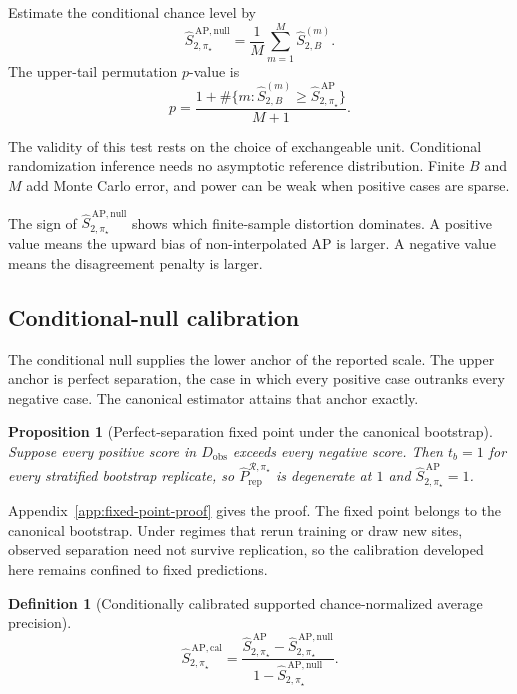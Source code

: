 \documentclass[11pt]{article}
\newcommand{\Regime}{\mathcal{R}}
\newcommand{\SAPHat}{\widehat S_{2,\pi_\star}^{\,\mathrm{AP}}}
\newcommand{\SAPnullHat}{\widehat S_{2,\pi_\star}^{\,\mathrm{AP,null}}}
\newcommand{\SAPcalHat}{\widehat S_{2,\pi_\star}^{\,\mathrm{AP,cal}}}
\newcommand{\PRepHat}{\widehat{P}_{\mathrm{rep}}^{\Regime,\pi_\star}}
\newtheorem{definition}{Definition}
\newtheorem{proposition}{Proposition}
\theoremstyle{remark}
\begin{document}
Estimate the conditional chance level by
\begin{equation}
\SAPnullHat
=
\frac{1}{M}\sum_{m=1}^{M}\widehat S_{2,B}^{(m)}.
\label{eq:conditional-null}
\end{equation}
The upper-tail permutation $p$-value is
\[
p
=
\frac{1+\#\{m:\widehat S_{2,B}^{(m)}\geq\SAPHat\}}{M+1}.
\]

The validity of this test rests on the choice of exchangeable unit. Conditional randomization inference needs no asymptotic reference distribution. Finite $B$ and $M$ add Monte Carlo error, and power can be weak when positive cases are sparse.

The sign of $\SAPnullHat$ shows which finite-sample distortion dominates. A positive value means the upward bias of non-interpolated AP is larger. A negative value means the disagreement penalty is larger.

\subsection{Conditional-null calibration}

The conditional null supplies the lower anchor of the reported scale. The upper anchor is perfect separation, the case in which every positive case outranks every negative case. The canonical estimator attains that anchor exactly.

\begin{proposition}[Perfect-separation fixed point under the canonical bootstrap]
\label{prop:fixed-point}
Suppose every positive score in $D_{\mathrm{obs}}$ exceeds every negative score. Then $t_b=1$ for every stratified bootstrap replicate, so $\PRepHat$ is degenerate at $1$ and $\SAPHat=1$.
\end{proposition}

Appendix~\ref{app:fixed-point-proof} gives the proof. The fixed point belongs to the canonical bootstrap. Under regimes that rerun training or draw new sites, observed separation need not survive replication, so the calibration developed here remains confined to fixed predictions.

\begin{definition}[Conditionally calibrated supported chance-normalized average precision]
\begin{equation}
\SAPcalHat
=
\frac{\SAPHat-\SAPnullHat}{1-\SAPnullHat}.
\label{eq:calibrated}
\end{equation}
\end{definition}
\end{document}
